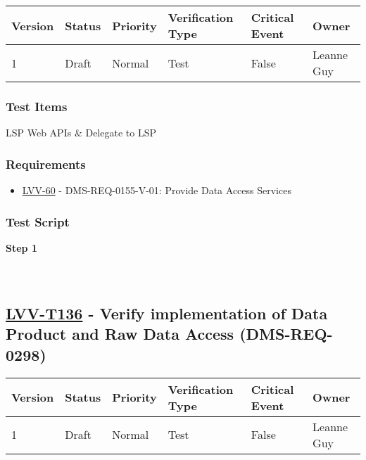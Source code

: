 \begin{longtable}[]{@{}llllll@{}}
\toprule
Version & Status & Priority & Verification Type & Critical Event &
Owner\tabularnewline
\midrule
\endhead
1 & Draft & Normal & Test & False & Leanne Guy\tabularnewline
\bottomrule
\end{longtable}

\hypertarget{test-items-35}{%
\subsubsection{Test Items}\label{test-items-35}}

LSP Web APIs \& Delegate to LSP

\hypertarget{requirements-35}{%
\subsubsection{Requirements}\label{requirements-35}}

\begin{itemize}
\tightlist
\item
  \href{https://jira.lsstcorp.org/browse/LVV-60}{LVV-60} -
  DMS-REQ-0155-V-01: Provide Data Access Services
\end{itemize}

\hypertarget{test-script-35}{%
\subsubsection{Test Script}\label{test-script-35}}

\textbf{Step 1}\\
~\\
~\\

\hypertarget{lvv-t136---verify-implementation-of-data-product-and-raw-data-access-dms-req-0298}{%
\subsection{\texorpdfstring{\href{https://jira.lsstcorp.org/secure/Tests.jspa\#/testCase/LVV-T136}{LVV-T136}
- Verify implementation of Data Product and Raw Data Access
(DMS-REQ-0298)}{LVV-T136 - Verify implementation of Data Product and Raw Data Access (DMS-REQ-0298)}}\label{lvv-t136---verify-implementation-of-data-product-and-raw-data-access-dms-req-0298}}

\begin{longtable}[]{@{}llllll@{}}
\toprule
Version & Status & Priority & Verification Type & Critical Event &
Owner\tabularnewline
\midrule
\endhead
1 & Draft & Normal & Test & False & Leanne Guy\tabularnewline
\bottomrule
\end{longtable}

